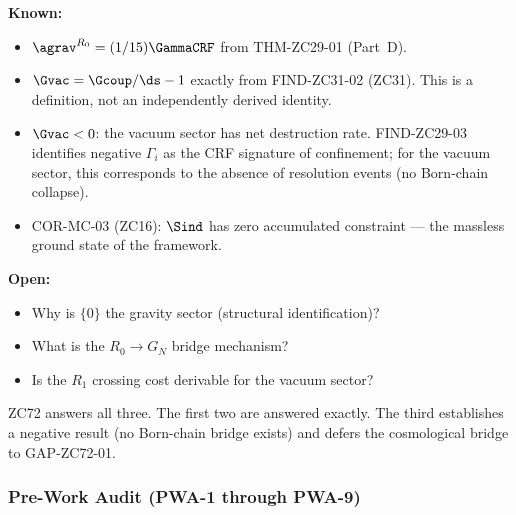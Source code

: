 \documentclass[12pt, a4paper]{article}
\begin{document}
\begin{keybox}[title={Pre-ZC72 Status of the Vacuum Sector}]
\textbf{Known:}
\begin{itemize}[leftmargin=2em, noitemsep]
  \item $\agrav^{R_0} = (1/15)\GammaCRF$ from THM-ZC29-01 (Part~D).
  \item $\Gvac = \Gcoup/\ds - 1$ exactly from FIND-ZC31-02 (ZC31).
    This is a definition, not an independently derived identity.
  \item $\Gvac < 0$: the vacuum sector has net destruction rate.
    FIND-ZC29-03 identifies negative $\Gamma_i$ as the CRF signature
    of confinement; for the vacuum sector, this corresponds to the
    absence of resolution events (no Born-chain collapse).
  \item COR-MC-03 (ZC16): $\Sind$ has zero accumulated constraint
    --- the massless ground state of the framework.
\end{itemize}

\textbf{Open:}
\begin{itemize}[leftmargin=2em, noitemsep]
  \item Why is $\{0\}$ the gravity sector (structural identification)?
  \item What is the $R_0 \to G_N$ bridge mechanism?
  \item Is the $R_1$ crossing cost derivable for the vacuum sector?
\end{itemize}

ZC72 answers all three. The first two are answered exactly.
The third establishes a negative result (no Born-chain bridge exists)
and defers the cosmological bridge to GAP-ZC72-01.
\end{keybox}

\subsubsection{Pre-Work Audit (PWA-1 through PWA-9)}
\end{document}
